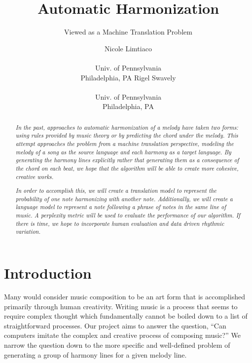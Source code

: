 \documentclass{sig-alternate}
\begin{document}
 

\title{Automatic Harmonization}
\subtitle{Viewed as a Machine Translation Problem}
\author{
\alignauthor Nicole Limtiaco \\  \\ Univ. of Pennsylvania \\ Philadelphia, PA
\alignauthor Rigel Swavely \\  \\ Univ. of Pennsylvania \\ Philadelphia, PA}
\date{}
\maketitle

\begin{abstract}
  \textit{In the past, approaches to automatic harmonization of a melody
  have taken two forms: using rules provided by music theory or by predicting
  the chord under the melody. This attempt approaches the problem from a machine translation perspective, 
  modeling the melody of a song as the source language and each harmony as a target language.
  By generating the harmony lines explicitly rather that generating them as a
  consequence of the chord on each beat, we hope that the algorithm will be able to create
  more cohesive, creative works.}

  \textit{In order to accomplish this, we will create a translation model to represent the probability
  of one note harmonizing with another note. Additionally, we will create a language model to represent
  a note following a phrase of notes in the same line of music. A perplexity metric will be used to 
  evaluate the performance of our algorithm. If there is time, we hope to incorporate human evaluation
  and data driven rhythmic variation.}
\end{abstract}

\section{Introduction}
\label{sec:intro}
Many would consider music composition to be an art form that is accomplished
primarily through human creativity. Writing music is a process that seems to require
complex thought which fundamentally cannot be boiled down to a list of straightforward
processes. Our project aims to answer the question, ``Can computers imitate the complex
and creative process of composing music?'' We narrow the question down to the more specific
and well-defined problem of generating a group of harmony lines for a given melody line.
\end{document}
